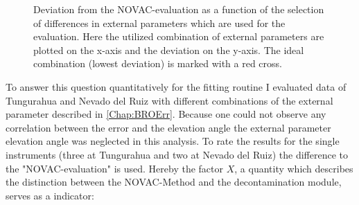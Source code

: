 \documentclass  [
  paper    = a4,
  BCOR     = 10mm,
  twoside,
  fontsize = 12pt,
  fleqn,
  toc      = bibnumbered,
  toc      = listofnumbered,
  numbers  = noendperiod,
  headings = normal,
  listof   = leveldown,
  version  = 3.03
]                                       {scrreprt}
\begin{document}
	\begin{figure}
		\caption[Deviation from the NOVAC-evaluation as a function of the selection of differences in external parameters which are used for the evaluation.]{Deviation from the NOVAC-evaluation as a function of the selection of differences in external parameters which are used for the evaluation. Here the utilized combination of external parameters are plotted on the x-axis and the deviation on the y-axis. The ideal combination (lowest deviation) is marked with a red cross.}
		\label{fig:WelcheEP}
	\end{figure}
	To answer this question quantitatively for the fitting routine I evaluated data of Tungurahua and Nevado del Ruiz with different combinations of the external parameter described in \cref{Chap:BROErr}. Because one could not observe any correlation between the  error and the elevation angle the external parameter elevation angle was neglected in this analysis. To rate the results for the single instruments (three at Tungurahua and two at Nevado del Ruiz) the difference to the "NOVAC-evaluation" is used. Hereby the factor $X$, a quantity which describes the distinction between the NOVAC-Method and the decontamination module, serves as a indicator:
\end{document}
